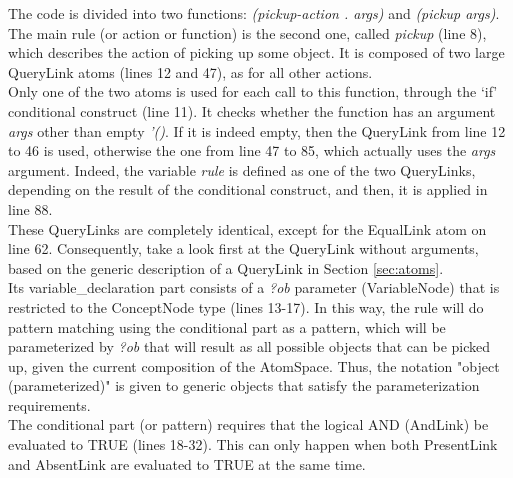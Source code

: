 The code is divided into two functions: \textit{(pickup-action . args)} and \textit{(pickup args)}. \\
The main rule (or action or function) is the second one, called \textit{pickup} (line 8), which describes the action of picking up some object.
It is composed of two large QueryLink atoms (lines 12 and 47), as for all other actions. \\
Only one of the two atoms is used for each call to this function, through the `if' conditional construct (line 11). It checks whether the function has an argument \textit{args} other than empty \textit{'()}. 
If it is indeed empty, then the QueryLink from line 12 to 46 is used, otherwise the one from line 47 to 85, which actually uses the \textit{args} argument.
Indeed, the variable \textit{rule} is defined as one of the two QueryLinks, depending on the result of the conditional construct, and then, it is applied in line 88. \\
These QueryLinks are completely identical, except for the EqualLink atom on line 62.
Consequently, take a look first at the QueryLink without arguments, based on the generic description of a QueryLink in Section \ref{sec:atoms}. \\

Its variable\_declaration part consists of a \textit{?ob} parameter (VariableNode) that is restricted to the ConceptNode type (lines 13-17). 
In this way, the rule will do pattern matching using the conditional part as a pattern, which will be parameterized by \textit{?ob} that will result as all possible objects that can be picked up, given the current composition of the AtomSpace. Thus, the notation "object (parameterized)" is given to generic objects that satisfy the parameterization requirements. \\

The conditional part (or pattern) requires that the logical AND (AndLink) be evaluated to TRUE (lines 18-32). This can only happen when both PresentLink and AbsentLink are evaluated to TRUE at the same time. 


